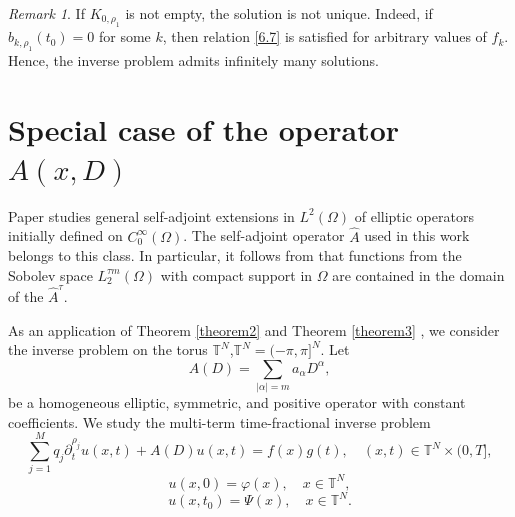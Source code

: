 \documentclass[12pt, reqno]{amsart}
\theoremstyle{definition}
\theoremstyle{remark}
\newtheorem{remark}[theorem]{Remark}
\numberwithin{equation}{section}
\begin{document}
\begin{remark}
If $K_{0,\rho_1}$ is not empty, the solution is not unique. Indeed, if $b_{k,\rho_1}(t_0)=0$ for some $k$, then relation \eqref{6.7} is satisfied for arbitrary values of $f_k$.
Hence, the inverse problem admits infinitely many solutions.
\end{remark}

\section{Special case of the operator $A(x,D)$}
\label{sec:7}
Paper \cite{27} studies general self-adjoint extensions in $L^2(\Omega)$ of elliptic operators
initially defined on $C_0^\infty(\Omega)$. The self-adjoint operator $\widehat{A}$ used in this
work belongs to this class. In particular, it follows from \cite{27} that functions from the
Sobolev space $L^{\tau m}_2(\Omega)$ with compact support in $\Omega$ are contained in the
domain of the  $\widehat{A}^\tau$.

As an application of Theorem \ref{theorem2} and Theorem \ref{theorem3} , we consider the inverse problem on the torus
$\mathbb{T}^N$,\quad $\mathbb{T}^N=(-\pi,\pi]^N$. Let
\[
A(D)=\sum_{|\alpha|=m} a_\alpha D^\alpha,
\]
be a homogeneous elliptic, symmetric, and positive operator with constant coefficients. We
study the multi-term time-fractional inverse problem
\begin{equation}\label{7.1}
\sum_{j=1}^M q_j  \partial_t^{\rho_j} u(x,t) + A(D)u(x,t) = f(x)g(t),
\quad (x,t) \in \mathbb{T}^N \times (0,T],
\end{equation}
\begin{equation}\label{7.2}
u(x,0) = \varphi(x), 
\quad x\in\mathbb{T}^N,
\end{equation}
\begin{equation}\label{7.3}
u(x,t_0) = \Psi(x), 
\quad x\in\mathbb{T}^N.
\end{equation}
\end{document}
